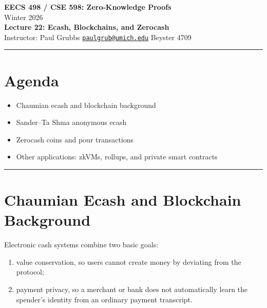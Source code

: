 \documentclass[11pt]{article}
\begin{document}
\begin{center}
  {\LARGE \textbf{EECS 498 / CSE 598: Zero-Knowledge Proofs}}\\[6pt]
  {\large Winter 2026}\\[4pt]
  {\large \textbf{Lecture 22: Ecash, Blockchains, and Zerocash}}\\[4pt]
  {\large Instructor: Paul Grubbs \quad
    \href{mailto:paulgrub@umich.edu}{\texttt{paulgrub@umich.edu}} \quad
    Beyster 4709}
\end{center}

\vspace{0.5em}
\hrule
\vspace{1em}

\section*{Agenda}
\begin{itemize}
  \item Chaumian ecash and blockchain background
  \item Sander--Ta Shma anonymous ecash
  \item Zerocash coins and pour transactions
  \item Other applications: zkVMs, rollups, and private smart contracts
\end{itemize}

\hrule
\vspace{1em}

\section{Chaumian Ecash and Blockchain Background}

Electronic cash systems combine two basic goals:
\begin{enumerate}
  \item value conservation, so users cannot create money by deviating from the
        protocol;
  \item payment privacy, so a merchant or bank does not automatically learn
        the spender's identity from an ordinary payment transcript.
\end{enumerate}
\end{document}
